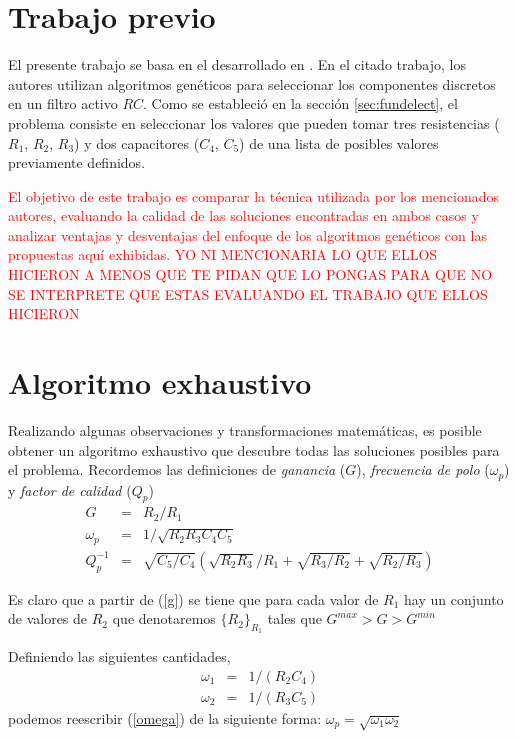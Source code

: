 \documentclass{llncs}
\begin{document}
    
  \section{\textbf{Trabajo previo}}
    \label{sec:previouswork}
    El presente trabajo se basa en el desarrollado en \cite{lov:rom:per}. En el citado trabajo, los autores
    utilizan algoritmos gen\'eticos para seleccionar los componentes discretos en un filtro activo $RC$. Como se
    estableci\'o en la secci\'on \ref{sec:fundelect}, el problema consiste en seleccionar los valores que pueden
    tomar tres resistencias ($R_1$, $R_2$, $R_3$) y dos capacitores ($C_4$,
    $C_5$) de una lista de posibles valores
    previamente definidos.
    
    \textcolor{red}{El objetivo de este trabajo es comparar la t\'ecnica
      utilizada por los mencionados autores, evaluando la calidad 
    de las soluciones encontradas en ambos casos y analizar ventajas y
    desventajas del enfoque de los algoritmos gen\'eticos 
    con las propuestas aqu\'i exhibidas. YO NI MENCIONARIA LO QUE ELLOS HICIERON
    A MENOS QUE TE PIDAN QUE LO PONGAS PARA QUE NO SE INTERPRETE QUE ESTAS
    EVALUANDO EL TRABAJO QUE ELLOS HICIERON}
  
  \section{\textbf{Algoritmo exhaustivo}}
    Realizando algunas observaciones y transformaciones matem\'aticas, es posible obtener un algoritmo exhaustivo que descubre
    todas las soluciones posibles para el problema. Recordemos las definiciones
    de \textit{ganancia} ($G$), \textit{frecuencia de polo} ($\omega_p$) y
    \textit{factor de calidad} ($Q_p$)
    \begin{eqnarray}
      G &=& R_2/R_1 \label{g}\\
      \omega_p &=& 1/\sqrt{R_2 R_3 C_4 C_5} \label{omega}\\
      Q^{-1}_p &=& \sqrt{C_5/C_4}  \left(\sqrt{R_2 R_3}/R_1 + \sqrt{R_3/R_2} +
      \sqrt{R_2/R_3}\right) \label{q}
    \end{eqnarray}

    Es claro que a partir de (\ref{g}) se tiene que para cada valor de $R_1$ hay
    un conjunto de valores de $R_2$ que denotaremos 
    $\{R_2\}_{R_1}$ tales que $G^{max} > G > G^{min}$

    Definiendo las siguientes cantidades,
    \begin{eqnarray}
      \omega_1 &=& 1/(R_2 C_4) \nonumber \\
      \omega_2 &=& 1/(R_3 C_5)
      \label{omegas}
    \end{eqnarray}
    podemos reescribir (\ref{omega}) de la siguiente forma: $\omega_p = \sqrt{\omega_1  \omega_2}$
\end{document}
